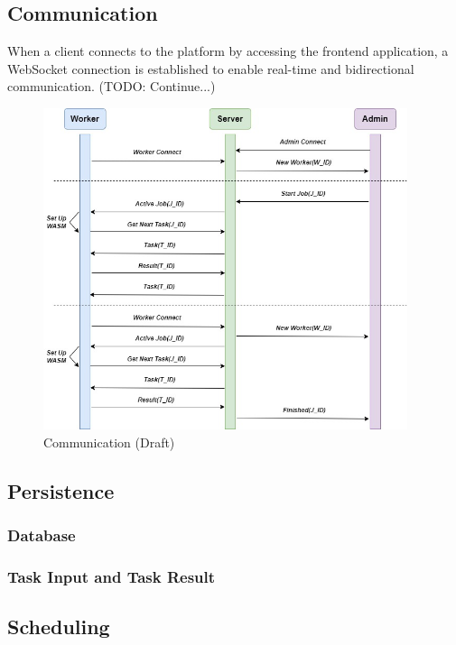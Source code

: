 \subsection{Communication}
\label{subsec:implementation:architecture:communication}
When a client connects to the platform by accessing the frontend application, a WebSocket connection is established to enable real-time and bidirectional communication. (TODO: Continue...)
\begin{figure}[htbp]
    \centering
    \includegraphics[width=0.95\textwidth]{gfx/figures/Communication.jpg}
    \caption{Communication (Draft)}
    \label{fig:implementation:architecture}
\end{figure}

\subsection{Persistence}
\label{subsec:implementation:architecture:persistence}


\subsubsection{Database}

\subsubsection{Task Input and Task Result}

\subsection{Scheduling}
\label{subsec:implementation:architecture:scheduling}


